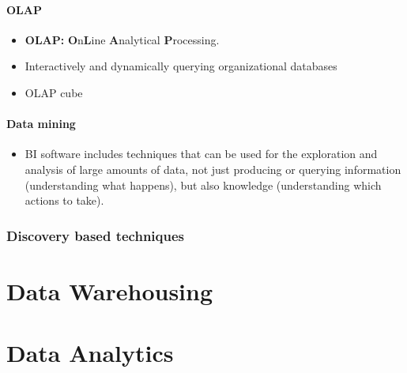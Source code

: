 \documentclass[a4paper,twoside,10pt]{report}
\begin{document}
\paragraph{OLAP}
\begin{itemize}
	\item \textbf{OLAP:} \textbf{O}n\textbf{L}ine \textbf{A}nalytical \textbf{P}rocessing.
	\item Interactively and dynamically querying organizational databases
	\item OLAP cube
\end{itemize}

\paragraph{Data mining}
\begin{itemize}
	\item BI software includes techniques that can  be used for the exploration and analysis of large amounts of data, not just producing or querying information (understanding what happens), but also knowledge (understanding which actions to take).
\end{itemize}
\subsubsection{Discovery based techniques}


\section{Data Warehousing}


\section{Data Analytics}
\end{document}
